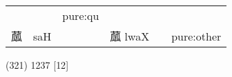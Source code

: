 \documentclass[14pt,a4paper]{scrartcl}
\begin{document}
\begin{longtable}[c]{@{}llllll@{}}
\begin{minipage}[t]{0.14\columnwidth}
\strut\end{minipage} &
\begin{minipage}[t]{0.14\columnwidth}\raggedright\strut
\strut\end{minipage} &
\begin{minipage}[t]{0.14\columnwidth}\raggedright\strut
pure:qu
\strut\end{minipage}\tabularnewline
\begin{minipage}[t]{0.14\columnwidth}\raggedright\strut
蓏
\strut\end{minipage} &
\begin{minipage}[t]{0.14\columnwidth}\raggedright\strut
saH
\strut\end{minipage} &
\begin{minipage}[t]{0.14\columnwidth}\raggedright\strut
\strut\end{minipage} &
\begin{minipage}[t]{0.14\columnwidth}\raggedright\strut
蓏 lwaX
\strut\end{minipage} &
\begin{minipage}[t]{0.14\columnwidth}\raggedright\strut
\strut\end{minipage} &
\begin{minipage}[t]{0.14\columnwidth}\raggedright\strut
pure:other
\strut\end{minipage}\tabularnewline
\bottomrule
\end{longtable}

(321) 1237 {[}12{]}
\end{document}
